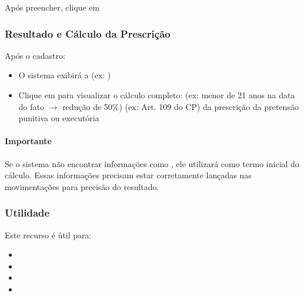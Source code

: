 \documentclass[letterpaper,10pt,brazil]{sphinxmanual}
\begin{document}
\sphinxAtStartPar
Após preencher, clique em 


\subsubsection{Resultado e Cálculo da Prescrição}
\label{\detokenize{projud_52_cadastroinfracoes:resultado-e-calculo-da-prescricao}}
\sphinxAtStartPar
Após o cadastro:
\begin{itemize}
\item {} 
\sphinxAtStartPar
O sistema exibirá a  (ex: )

\item {} 
\sphinxAtStartPar
Clique em  para visualizar o cálculo completo:
\sphinxhyphen{} 
\sphinxhyphen{} 
\sphinxhyphen{} 
\sphinxhyphen{}  (ex: menor de 21 anos na data do fato \(\rightarrow\) redução de 50\%)
\sphinxhyphen{}  (ex: Art. 109 do CP)
\sphinxhyphen{}  da prescrição da pretensão punitiva ou executória

\end{itemize}


\paragraph{Importante}
\label{\detokenize{projud_52_cadastroinfracoes:importante}}
\sphinxAtStartPar
Se o sistema não encontrar informações como , ele utilizará  como termo inicial do cálculo. Essas informações precisam estar corretamente lançadas nas movimentações para precisão do resultado.


\subsubsection{Utilidade}
\label{\detokenize{projud_52_cadastroinfracoes:utilidade}}
\sphinxAtStartPar
Este recurso é útil para:
\begin{itemize}
\item {} 
\sphinxAtStartPar
{}

\item {} 
\sphinxAtStartPar
{}

\item {} 
\sphinxAtStartPar
{}

\item {} 
\sphinxAtStartPar
{}

\end{itemize}
\end{document}
